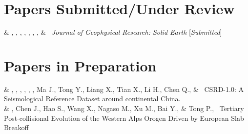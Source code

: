 \section{Papers Submitted/Under Review}

\begin{EntriesTableExtra}
     &
    \msz, \csh, \Me, \wjp, \wwl, \sunl, \wxx, \& \wlx \ 
    \emph{Journal of Geophysical Research: Solid Earth}
    [\textit{Submitted}]
\end{EntriesTableExtra}

\section{Papers in Preparation}
\begin{EntriesTableExtra}
     &
    \Me\CS, \csh, \wjp, \wwl, \sunl, \wxx, Ma J., Tong Y., Liang X., Tian X., Li H., Chen Q., \& \wlx \ 
    CSRD-1.0: A Seismological Reference Dataset around continental China.
    \\
    \Year{on} &
    \Me, Chen J., Hao S., Wang X., Nagaso M., Xu M., Bai Y., \& Tong P.\CS, \
    Tertiary Post-collisional Evolution of the Western Alps Orogen Driven by European Slab Breakoff
\end{EntriesTableExtra}

